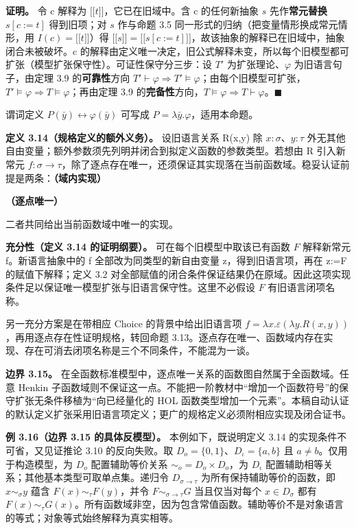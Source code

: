 \documentclass[UTF8,a4paper,zihao=-4,fontset=windows,openany]{ctexbook}
\newcommand{\mcsdisplay}[1]{%
  \par\addvspace{0.7em}%
  \sbox{\mcsmathbox}{\ensuremath{\displaystyle #1}}%
  \ifdim\wd\mcsmathbox>\linewidth
    \noindent\resizebox{\linewidth}{!}{\usebox{\mcsmathbox}}%
  \else
    \noindent\hspace*{\fill}\usebox{\mcsmathbox}\hspace*{\fill}%
  \fi
  \par\addvspace{0.7em}%
}
\def\ensuremath#1{#1}%
\providecommand{\llbracket}{\mathopen{[\![}}
\providecommand{\rrbracket}{\mathclose{]\!]}}
\begin{document}
\textbf{证明。} 令 c 解释为 \(\llbracket t\rrbracket\)，它已在旧域中。含 c 的任何新抽象 \(s\) 先作\textbf{常元替换} \(s[c:=t]\) 得到旧项；对 \(s\) 作与命题 3.5 同一形式的归纳（把变量情形换成常元情形，用 \(I(c)=\llbracket t\rrbracket\)）得 \(\llbracket s\rrbracket=\llbracket s[c:=t]\rrbracket\)，故该抽象的解释已在旧域中，抽象闭合未被破坏。c 的解释由定义唯一决定，旧公式解释未变，所以每个旧模型都可扩张（模型扩张保守性）。可证性保守分三步：设 \(T'\) 为扩张理论、\(\varphi\) 为旧语言句子，由定理 3.9 的\textbf{可靠性}方向 \(T'\vdash\varphi\Rightarrow T'\models\varphi\)；由每个旧模型可扩张，\(T'\models\varphi\Rightarrow T\models\varphi\)；再由定理 3.9 的\textbf{完备性}方向，\(T\models\varphi\Rightarrow T\vdash\varphi\)。\(\blacksquare\)

谓词定义 \(P(\bar{y})\leftrightarrow\varphi(\bar{y})\) 可写成 \(P=\lambda\bar{y}.\varphi\)，适用本命题。

\textbf{定义 3.14（规格定义的额外义务）。} 设旧语言关系 R(x,y) 除 \(x:\sigma\)、\(y:\tau\) 外无其他自由变量；额外参数须先列明并闭合到拟定义函数的参数类型。若想由 R 引入新常元 \(f:\sigma\to\tau\)，除了逐点存在唯一，还须保证其实现落在当前函数域。稳妥认证前提是两条：\textbf{（域内实现）}


\mcsdisplay{T\vdash \exists f:\sigma\to\tau.\ \forall x\,R(x,fx)}
\noindent \textbf{（逐点唯一）}


\mcsdisplay{T\vdash\forall x\forall y\forall z.\,((R(x,y)\land R(x,z))\Rightarrow y=z).}
\noindent 二者共同给出当前函数域中唯一的实现。

\textbf{充分性（定义 3.14 的证明纲要）。} 可在每个旧模型中取该已有函数 \(F\) 解释新常元 f。新语言抽象中的 f 全部改为同类型的新自由变量 z，得到旧语言项，再在 z:=F 的赋值下解释；定义 3.2 对全部赋值的闭合条件保证结果仍在原域。因此这项实现条件足以保证唯一模型扩张与旧语言保守性。这里不必假设 \(F\) 有旧语言闭项名称。

另一充分方案是在带相应 Choice 的背景中给出旧语言项 \(f=\lambda x.\varepsilon(\lambda y.R(x,y))\)，再用逐点存在性证明规格，转回命题 3.13。逐点存在唯一、函数域内存在实现、存在可消去闭项名称是三个不同条件，不能混为一谈。

\textbf{边界 3.15。} 在全函数标准模型中，逐点唯一关系的函数图自然属于全函数域。任意 Henkin 子函数域则不保证这一点。不能把一阶教材中“增加一个函数符号”的保守扩张无条件移植为“向已经量化的 HOL 函数类型增加一个元素”。本稿自动认证的默认定义扩张采用旧语言项定义；更广的规格定义必须附相应实现及闭合证书。

\textbf{例 3.16（边界 3.15 的具体反模型）。} 本例如下，既说明定义 3.14 的实现条件不可省，又见证推论 3.10 的反向失败。取 \(D_o=\{0,1\}\)、\(D_\iota=\{a,b\}\) 且 \(a\ne b\)。仅用于构造模型，为 \(D_o\) 配置辅助等价关系 \(\sim_o=D_o\times D_o\)，为 \(D_\iota\) 配置辅助相等关系；其他基本类型可取单点集。递归令 \(D_{\sigma\to\tau}\) 为所有保持辅助等价的函数，即 \(x\sim_\sigma y\) 蕴含 \(F(x)\sim_\tau F(y)\)，并令 \(F\sim_{\sigma\to\tau}G\) 当且仅当对每个 \(x\in D_\sigma\) 都有 \(F(x)\sim_\tau G(x)\)。所有函数域非空，因为包含常值函数。辅助等价不是对象语言的等式；对象等式始终解释为真实相等。
\end{document}
